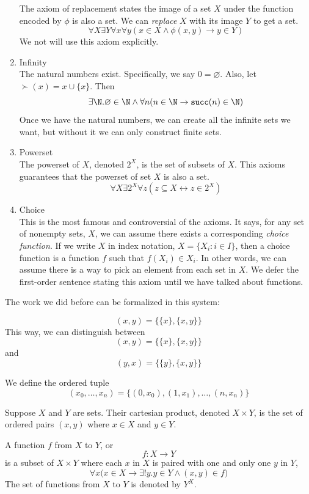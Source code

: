 \message{ !name(truth.tex)}\documentclass{scrbook}
\renewcommand{\implies}{\to}
\renewcommand{\iff}{\leftrightarrow}
\renewcommand{\emptyset}{\varnothing}
\begin{document}
\begin{enumerate}
  
  The axiom of replacement states the image of a set $X$ under the function encoded by $\phi$ is also a set. We can \emph{replace} $X$ with its image $Y$ to get a set.
  \[
  \forall X \exists Y \forall x \forall y (x\in X \wedge \phi(x,y) \implies y\in Y)
  \]
  We not will use this axiom explicitly. 
\item Infinity \\
  The natural numbers exist. Specifically, we say $0=\emptyset$. Also, let $\succ(x)=x\cup \{x\}$. Then
  \[
  \exists \N . \emptyset\in\N \wedge \forall n ( n\in \N\implies \succ(n)\in\N)
  \]
  Once we have the natural numbers, we can create all the infinite sets we want, but without it we can only construct finite sets. 
\item Powerset \\
  The powerset of $X$, denoted $2^X$, is the set of subsets of $X$. This axioms guarantees that the powerset of set $X$ is also a set. 
  \[
  \forall X \exists 2^X \forall z (z\subseteq X \iff z \in 2^X)
  \]
\item Choice \\
This is the most famous and controversial of the \zfc axioms. It says, for any set of nonempty sets, $X$, we can assume there exists a corresponding \emph{choice function}. If we write $X$ in index notation, $X=\{X_i:i\in I\}$, then a choice function is a function $f$ such that $f(X_i)\in X_i$. In other words, we can assume there is a way to pick an element from each set in $X$. We defer the first-order sentence stating this axiom until we have talked about functions.  
 \label{zfc:choice}
\end{enumerate}
The work we did before can be formalized in this system:
\begin{defn}
 \[(x,y)=\bigl\{\{x\},\{x,y\}\bigr\}\]
 This way, we can distinguish between
 \[
 (x,y)=\bigl\{\{x\},\{x,y\}\bigr\}
 \]
 and
 \[
 (y,x)=\bigl\{\{y\},\{x,y\}\bigr\}
 \]
\end{defn}
\begin{defn}
  We define the ordered tuple
  \[
  (x_0,\dots,x_n)= \{(0,x_0),(1,x_1),\dots,(n,x_n)\}
  \]
\end{defn}

\begin{defn}
  Suppose $X$ and $Y$ are sets. Their cartesian product, denoted $X\times Y$, is the set of ordered pairs $(x,y)$ where $x\in X$ and $y\in Y$. 
\end{defn}

\begin{defn}[function]
  A function $f$ from $X$ to $Y$, or 
  \[
  f: X\to Y
  \]
  is a subset of $X\times Y$ where each $x$ in $X$ is paired with one and only one $y$ in $Y$, \ie
  \[
  \forall x \bigl(x\in X \implies\exists! y. y\in Y \wedge (x,y)\in f\bigr)
  \]
  The set of functions from $X$ to $Y$ is denoted by  $Y^X$. 
\end{defn}
\end{document}
